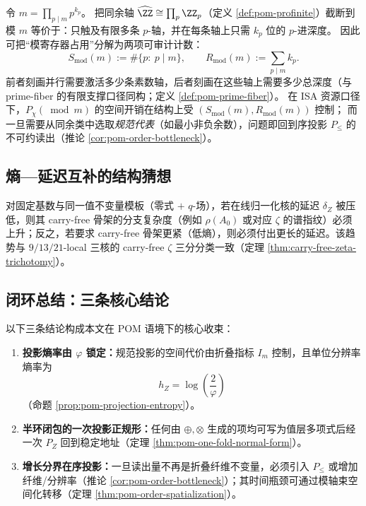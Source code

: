 \begin{remark}\label{rem:pom-mod-support-count}
令 \(m=\prod_{p\mid m}p^{k_p}\)。
把同余轴 \(\widehat{\ZZ}\cong\prod_p\ZZ_p\)（定义 \ref{def:pom-profinite}）截断到模 \(m\) 等价于：只触及有限多条 \(p\)-轴，并在每条轴上只需 \(k_p\) 位的 \(p\)-进深度。
因此可把“模寄存器占用”分解为两项可审计计数：
\[
S_{\mathrm{mod}}(m):=\#\{p:\ p\mid m\},\qquad
R_{\mathrm{mod}}(m):=\sum_{p\mid m}k_p.
\]
前者刻画并行需要激活多少条素数轴，后者刻画在这些轴上需要多少总深度（与 prime-fiber 的有限支撑口径同构；定义 \ref{def:pom-prime-fiber}）。
在 ISA 资源口径下，\(P_\chi(\bmod m)\) 的空间开销在结构上受 \((S_{\mathrm{mod}}(m),R_{\mathrm{mod}}(m))\) 控制；
而一旦需要从同余类中选取\emph{规范代表}（如最小非负余数），问题即回到序投影 \(P_{\le}\) 的不可约读出（推论 \ref{cor:pom-order-bottleneck}）。
\end{remark}

\subsection{熵—延迟互补的结构猜想}\label{subsec:pom-entropy-delay}
\begin{conjecture}\label{conj:pom-entropy-delay}
对固定基数与同一值不变量模板（零式 $+$ $q$-场），若在线归一化核的延迟 $\delta_Z$ 被压低，则其 carry-free 骨架的分支复杂度（例如 $\rho(A_0)$ 或对应 $\zeta$ 的谱指纹）必须上升；反之，若要求 carry-free 骨架更紧（低熵），则必须付出更长的延迟。该趋势与 $9/13/21$-local 三核的 carry-free $\zeta$ 三分分类一致（定理 \ref{thm:carry-free-zeta-trichotomy}）。
\end{conjecture}

\subsection{闭环总结：三条核心结论}\label{subsec:pom-summary}
以下三条结论构成本文在 POM 语境下的核心收束：
\begin{enumerate}
  \item \textbf{投影熵率由 $\varphi$ 锁定：}规范投影的空间代价由折叠指标 $I_m$ 控制，且单位分辨率熵率为
  \[
  h_Z=\log\!\left(\frac{2}{\varphi}\right)
  \]
  （命题 \ref{prop:pom-projection-entropy}）。
  \item \textbf{半环闭包的一次投影正规形：}任何由 $\oplus,\otimes$ 生成的项均可写为值层多项式后经一次 $P_Z$ 回到稳定地址（定理 \ref{thm:pom-one-fold-normal-form}）。
  \item \textbf{增长分界在序投影：}一旦读出量不再是折叠纤维不变量，必须引入 $P_{\le}$ 或增加纤维/分辨率（推论 \ref{cor:pom-order-bottleneck}）；其时间瓶颈可通过模轴束空间化转移（定理 \ref{thm:pom-order-spatialization}）。
\end{enumerate}
